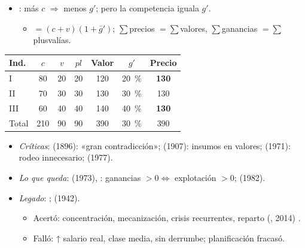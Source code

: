 \documentclass{article}
\begin{document}
\begin{columnas}
\begin{itemize}
\item {}: más $c$ $\Rightarrow$ menos $g'$; pero la competencia iguala $g'$.
  \begin{itemize}
  \item {} $=(c+v)(1+\bar g')$; $\sum$precios $=\sum$valores, $\sum$ganancias $=\sum$plusvalías.
  \end{itemize}
\end{itemize}
\begin{center}\footnotesize\setlength{\tabcolsep}{3pt}
\begin{tabular}{@{}lcccccc@{}}
\toprule
\textbf{Ind.} & $c$ & $v$ & $\mathit{pl}$ & \textbf{Valor} & $g'$ & \textbf{Precio}\\
\midrule
I & 80 & 20 & 20 & 120 & 20~\% & \textbf{130}\\
II & 70 & 30 & 30 & 130 & 30~\% & 130\\
III & 60 & 40 & 40 & 140 & 40~\% & \textbf{130}\\
\midrule
Total & 210 & 90 & 90 & 390 & 30~\% & 390\\
\bottomrule
\end{tabular}
\end{center}
\begin{itemize}
\item \emph{Críticas}:  (1896): «gran contradicción»;  (1907): insumos en valores;  (1971): rodeo innecesario;  (1977).
\item \emph{Lo que queda}:  (1973), : ganancias $>0\Leftrightarrow$ explotación $>0$;  (1982).
\item \emph{Legado}: ;  (1942).
  \begin{itemize}
  \item Acertó: concentración, mecanización, crisis recurrentes, reparto (, 2014) .
  \item Falló: ↑ salario real, clase media, sin derrumbe; planificación fracasó.
  \end{itemize}
\end{itemize}


\end{columnas}
\end{document}
